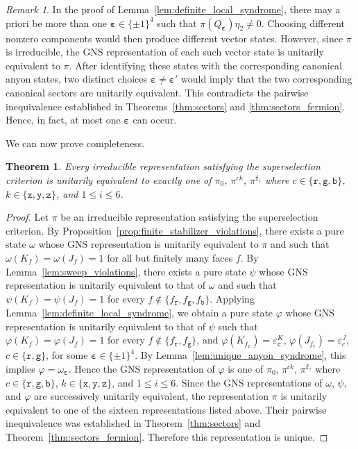 \documentclass[a4paper,11pt]{article}
\newtheorem{theorem}{Theorem}[section]
\theoremstyle{definition}
\theoremstyle{remark}
\newtheorem{remark}{Remark}[section]
\theoremstyle{remark}
\begin{document}
\begin{remark}
    In the proof of Lemma~\ref{lem:definite_local_syndrome}, there may a priori be more than one $\boldsymbol{\varepsilon}\in\{\pm1\}^4$ such that $\pi(Q_{\boldsymbol{\varepsilon}})\eta_2\neq0$. Choosing different nonzero components would then produce different vector states. However, since $\pi$ is irreducible, the GNS representation of each such vector state is unitarily equivalent to $\pi$. After identifying these states with the corresponding canonical anyon states, two distinct choices $\boldsymbol{\varepsilon}\neq\boldsymbol{\varepsilon}'$ would imply that the two corresponding canonical sectors are unitarily equivalent. This contradicts the pairwise inequivalence established in Theorems~\ref{thm:sectors} and \ref{thm:sectors_fermion}. Hence, in fact, at most one $\boldsymbol{\varepsilon}$ can occur.
\end{remark}

We can now prove completeness.

\begin{theorem}\label{thm:complete_sectors}
    Every irreducible representation satisfying the superselection
    criterion is unitarily equivalent to exactly one of $\pi_0$, $\pi^{ck}$, $\pi^{\mathtt f_i}$ where $c\in\{\mathtt r,\mathtt g,\mathtt b\}$, $k\in\{\mathtt x,\mathtt y,\mathtt z\}$, and $1\leq i\leq6$. 
\end{theorem}

\begin{proof}
    Let $\pi$ be an irreducible representation satisfying the superselection criterion. By Proposition~\ref{prop:finite_stabilizer_violations}, there exists a pure state $\omega$ whose GNS representation is unitarily equivalent to $\pi$ and such that $\omega(K_f)=\omega(J_f)=1$ for all but finitely many faces $f$. By Lemma~\ref{lem:sweep_violations}, there exists a pure state $\psi$ whose GNS representation is unitarily equivalent to that of $\omega$ and such that $\psi(K_f)=\psi(J_f)=1$ for every $f\notin\{f_{\mathtt r},f_{\mathtt g},f_{\mathtt b}\}$. Applying Lemma~\ref{lem:definite_local_syndrome}, we obtain a pure state $\varphi$ whose GNS representation is unitarily equivalent to that of $\psi$ such that $\varphi(K_f)=\varphi(J_f)=1$ for every $f\notin\{f_{\mathtt r},f_{\mathtt g}\}$, and $\varphi(K_{f_{\mathtt c}}) = \varepsilon_{\mathtt c}^K$, $\varphi(J_{f_{c}}) = \varepsilon_{c}^J$, $c\in\{\mathtt r,\mathtt g\}$, for some $\boldsymbol{\varepsilon}\in\{\pm1\}^4$. By Lemma~\ref{lem:unique_anyon_syndrome}, this implies $\varphi=\omega_{\boldsymbol{\varepsilon}}$. Hence the GNS representation of $\varphi$ is one of $\pi_0$, $\pi^{ck}$, $\pi^{\mathtt f_i}$ where $c\in\{\mathtt r,\mathtt g,\mathtt b\}$, $k\in\{\mathtt x,\mathtt y,\mathtt z\}$, and $1\leq i\leq6$. Since the GNS representations of $\omega$, $\psi$, and $\varphi$ are successively unitarily equivalent, the representation $\pi$ is unitarily equivalent to one of the sixteen representations listed above. Their pairwise inequivalence was established in Theorem~\ref{thm:sectors} and Theorem~\ref{thm:sectors_fermion}. Therefore this representation is unique.
\end{proof}
\end{document}
